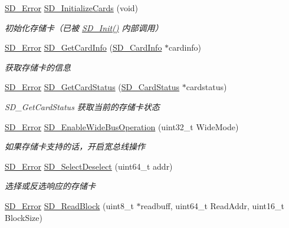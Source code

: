 \begin{DoxyCompactItemize}
\hyperlink{group__sd__card_gacff91fa68daa1d1ee967b5b3fb3dbd8c}{S\+D\+\_\+\+Error} \hyperlink{group__sd__card__private_gab39f671413ee824a13bf1bd833f724e9}{S\+D\+\_\+\+Initialize\+Cards} (void)
\begin{DoxyCompactList}\small\item\em 初始化存储卡（已被 \hyperlink{group__sd__card_ga3c927d4d98ffb6f3cc2442b09c19926c}{S\+D\+\_\+\+Init()} 内部调用） \end{DoxyCompactList}\item 
\hyperlink{group__sd__card_gacff91fa68daa1d1ee967b5b3fb3dbd8c}{S\+D\+\_\+\+Error} \hyperlink{group__sd__card__private_ga5348c3c8f17f8c704bf00f1c5e21549d}{S\+D\+\_\+\+Get\+Card\+Info} (\hyperlink{struct_s_d___card_info}{S\+D\+\_\+\+Card\+Info} $\ast$cardinfo)
\begin{DoxyCompactList}\small\item\em 获取存储卡的信息 \end{DoxyCompactList}\item 
\hyperlink{group__sd__card_gacff91fa68daa1d1ee967b5b3fb3dbd8c}{S\+D\+\_\+\+Error} \hyperlink{group__sd__card__private_ga858e0742dd01b2e2f6f397d30de6428f}{S\+D\+\_\+\+Get\+Card\+Status} (\hyperlink{struct_s_d___card_status}{S\+D\+\_\+\+Card\+Status} $\ast$cardstatus)
\begin{DoxyCompactList}\small\item\em S\+D\+\_\+\+Get\+Card\+Status 获取当前的存储卡状态 \end{DoxyCompactList}\item 
\hyperlink{group__sd__card_gacff91fa68daa1d1ee967b5b3fb3dbd8c}{S\+D\+\_\+\+Error} \hyperlink{group__sd__card__private_ga6569e73a229e639d2043549942d58d11}{S\+D\+\_\+\+Enable\+Wide\+Bus\+Operation} (uint32\+\_\+t Wide\+Mode)
\begin{DoxyCompactList}\small\item\em 如果存储卡支持的话，开启宽总线操作 \end{DoxyCompactList}\item 
\hyperlink{group__sd__card_gacff91fa68daa1d1ee967b5b3fb3dbd8c}{S\+D\+\_\+\+Error} \hyperlink{group__sd__card__private_ga849eb0b385337453139a7567898dacb7}{S\+D\+\_\+\+Select\+Deselect} (uint64\+\_\+t addr)
\begin{DoxyCompactList}\small\item\em 选择或反选响应的存储卡 \end{DoxyCompactList}\item 
\hyperlink{group__sd__card_gacff91fa68daa1d1ee967b5b3fb3dbd8c}{S\+D\+\_\+\+Error} \hyperlink{group__sd__card__private_ga1b2b4c1bf25da0771325b00cd638129d}{S\+D\+\_\+\+Read\+Block} (uint8\+\_\+t $\ast$readbuff, uint64\+\_\+t Read\+Addr, uint16\+\_\+t Block\+Size)

\end{DoxyCompactItemize}
